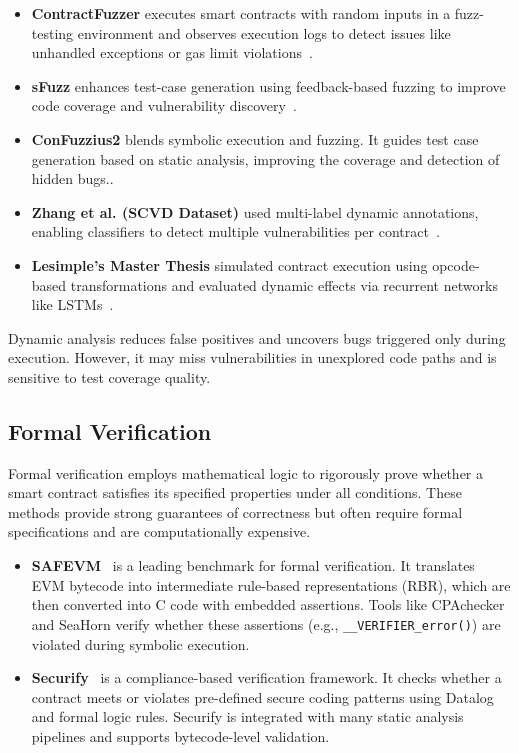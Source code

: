 \begin{itemize}
  \item \textbf{ContractFuzzer} executes smart contracts with random inputs in a fuzz-testing environment and observes execution logs to detect issues like unhandled exceptions or gas limit violations~\cite{feng2024interpretable}.
  \item \textbf{sFuzz} enhances test-case generation using feedback-based fuzzing to improve code coverage and vulnerability discovery~\cite{feng2024interpretable}.
  \item \textbf{ConFuzzius2} blends symbolic execution and fuzzing. It guides test case generation based on static analysis, improving the coverage and detection of hidden bugs..
  \item \textbf{Zhang et al. (SCVD Dataset)} used multi-label dynamic annotations, enabling classifiers to detect multiple vulnerabilities per contract~\cite{zhang2020scvd}.
  \item \textbf{Lesimple’s Master Thesis} simulated contract execution using opcode-based transformations and evaluated dynamic effects via recurrent networks like LSTMs~\cite{lesimple2020master}.
\end{itemize}

Dynamic analysis reduces false positives and uncovers bugs triggered only during execution. However, it may miss vulnerabilities in unexplored code paths and is sensitive to test coverage quality.

\subsection*{Formal Verification}

Formal verification employs mathematical logic to rigorously prove whether a smart contract satisfies its specified properties under all conditions. These methods provide strong guarantees of correctness but often require formal specifications and are computationally expensive.

\begin{itemize}
  \item \textbf{SAFEVM}~\cite{albert2019safevm} is a leading benchmark for formal verification. It translates EVM bytecode into intermediate rule-based representations (RBR), which are then converted into C code with embedded assertions. Tools like CPAchecker and SeaHorn verify whether these assertions (e.g., \texttt{\_\_VERIFIER\_error()}) are violated during symbolic execution.
  \item \textbf{Securify}~\cite{durieux2020empirical} is a compliance-based verification framework. It checks whether a contract meets or violates pre-defined secure coding patterns using Datalog and formal logic rules. Securify is integrated with many static analysis pipelines and supports bytecode-level validation.
\end{itemize}

